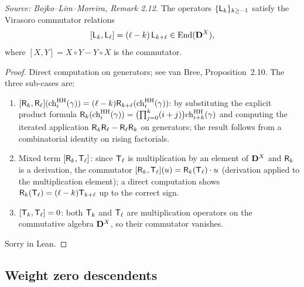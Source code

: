 \begin{theorem}[VirasoroBracket]
  \label{thm:virasoro-bracket}
  \textit{Source: Bojko--Lim--Moreira, Remark 2.12.}
  The operators \(\{\mathsf{L}_k\}_{k \geq -1}\) satisfy the Virasoro commutator relations
  \[[\mathsf{L}_k, \mathsf{L}_\ell] = (\ell - k)\, \mathsf{L}_{k+\ell} \in \mathrm{End}(\mathbf{D}^X),\]
  where \([X,Y] = X \circ Y - Y \circ X\) is the commutator.
\end{theorem}

\begin{proof}
  Direct computation on generators; see van Bree, Proposition~2.10. The three sub-cases are:
  \begin{enumerate}
  \item[(a)] \([\mathsf{R}_k, \mathsf{R}_\ell](\mathrm{ch}^{\mathrm{HH}}_i(\gamma)) = (\ell - k)\mathsf{R}_{k+\ell}(\mathrm{ch}^{\mathrm{HH}}_i(\gamma))\):
        by substituting the explicit product formula \(\mathsf{R}_k(\mathrm{ch}^{\mathrm{HH}}_i(\gamma)) = \bigl(\prod_{j=0}^k(i+j)\bigr)\mathrm{ch}^{\mathrm{HH}}_{i+k}(\gamma)\)
        and computing the iterated application \(\mathsf{R}_k \mathsf{R}_\ell - \mathsf{R}_\ell \mathsf{R}_k\) on generators;
        the result follows from a combinatorial identity on rising factorials.
  \item[(b)] Mixed term \([\mathsf{R}_k, \mathsf{T}_\ell]\): since \(\mathsf{T}_\ell\) is multiplication by
        an element of \(\mathbf{D}^X\) and \(\mathsf{R}_k\) is a derivation, the commutator
        \([\mathsf{R}_k, \mathsf{T}_\ell](u) = \mathsf{R}_k(\mathsf{T}_\ell) \cdot u\) (derivation applied to the
        multiplication element); a direct computation shows \(\mathsf{R}_k(\mathsf{T}_\ell) = (\ell - k)\mathsf{T}_{k+\ell}\)
        up to the correct sign.
  \item[(c)] \([\mathsf{T}_k, \mathsf{T}_\ell] = 0\): both \(\mathsf{T}_k\) and \(\mathsf{T}_\ell\) are multiplication
        operators on the commutative algebra \(\mathbf{D}^X\), so their commutator vanishes.
  \end{enumerate}
  Sorry in Lean.
\end{proof}

\subsection{Weight zero descendents}

